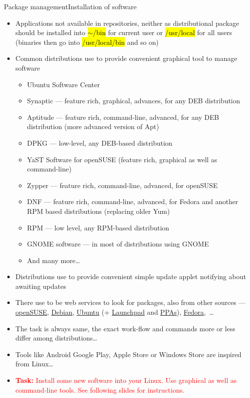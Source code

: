 \documentclass[compress, ucs, xelatex, 11pt, xcolor=svgnames,
  hyperref={
    bookmarks=true,
    unicode=true,
    colorlinks=true,
    pdftitle={Linux, command line and MetaCentrum},
    plainpages=false,
    pdfauthor={Vojtech Zeisek},
    pdfsubject={Course about use of Linux command line, writing shell scripts and using MetaCentrum of CESNET},
    pdfcreator={XeLaTeX},
    pdfkeywords={Linux, GNU, BASH, shell, command line, MetaCentrum},
    linkcolor=DarkRed,
    anchorcolor=DarkBlue,
    citecolor=Indigo,
    filecolor=NavyBlue,
    menucolor=DarkMagenta,
    urlcolor=DarkBlue,
    pdftex},
  url={hyphens, lowtilde} %
  ]{beamer}
\renewcommand{\texttt}[1]{\hl{\ttfamily #1}}
\renewcommand{\alert}[1]{\textcolor{red}{#1}}
\begin{document}
\begin{frame}[allowframebreaks]{Package management}{Installation of software}
\begin{itemize}
    \item Applications not available in repositories, neither as distributional package should be installed into \texttt{$\sim$/bin} for current user or \texttt{/usr/local} for all users (binaries then go into \texttt{/usr/local/bin} and so on)
    \item Common distributions use to provide convenient graphical tool to manage software
    \begin{itemize}
      \item Ubuntu Software Center
      \item Synaptic --- feature rich, graphical, advances, for any DEB distribution
      \item Aptitude --- feature rich, command-line, advanced, for any DEB distribution (more advanced version of Apt)
      \item DPKG --- low-level, any DEB-based distribution
      \item YaST Software for openSUSE (feature rich, graphical as well as command-line)
      \item Zypper --- feature rich, command-line, advanced, for openSUSE
      \item DNF --- feature rich, command-line, advanced, for Fedora and another RPM based distributions (replacing older Yum)
      \item RPM --- low level, any RPM-based distribution
      \item GNOME software --- in most of distributions using GNOME
      \item And many more\ldots
    \end{itemize}
    \item Distributions use to provide convenient simple update applet notifying about awaiting updates
    \item There use to be web services to look for packages, also from other sources --- \href{https://software.opensuse.org/search}{openSUSE}, \href{https://www.debian.org/distrib/packages\#search_packages}{Debian}, \href{https://packages.ubuntu.com/}{Ubuntu} (+ \href{https://launchpad.net/ubuntu/+search}{Launchpad} and \href{https://launchpad.net/ubuntu/+ppas}{PPAs}), \href{https://apps.fedoraproject.org/packages/}{Fedora},~\ldots
    \item The task is always same, the exact work-flow and commands more or less differ among distributions\ldots
    \item Tools like Android Google Play, Apple Store or Windows Store are inspired from Linux\ldots
    \item \alert{\textbf{Task:} Install some new software into your Linux. Use graphical as well as command-line tools. See following slides for instructions.}
  \end{itemize}
\end{frame}
\end{document}

